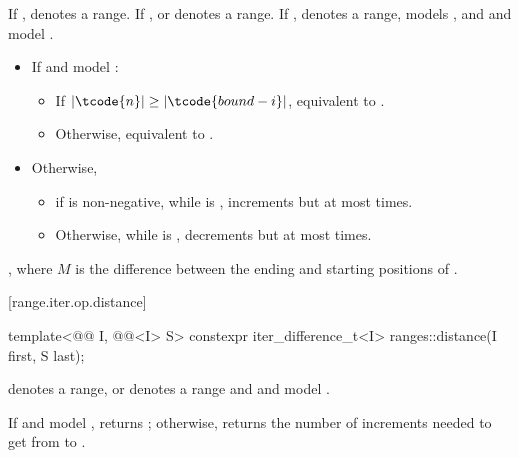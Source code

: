 \begin{itemdescr}
\pnum
\expects
If ,  denotes a range.
If ,  or  denotes a range.
If ,  denotes a range,
 models , and
 and  model .

\pnum
\effects
\begin{itemize}
\item If  and  model :
  \begin{itemize}
  \item If \brk{}$|\tcode{n}| \ge |\tcode{bound - i}|$,
    equivalent to .
  \item Otherwise, equivalent to .
  \end{itemize}
\item Otherwise,
  \begin{itemize}
  \item if  is non-negative,
    while  is ,
    increments  but at most  times.
  \item Otherwise,
    while  is ,
    decrements  but at most  times.
  \end{itemize}
\end{itemize}

\pnum
\returns
{}, where $M$ is the difference between
the ending and starting positions of .
\end{itemdescr}

[range.iter.op.distance]{}
%
\begin{itemdecl}
template<@@ I, @@<I> S>
  constexpr iter_difference_t<I> ranges::distance(I first, S last);
\end{itemdecl}

\begin{itemdescr}
\pnum
\expects
{} denotes a range, or
 denotes a range and
 and  model
.

\pnum
\effects
If  and  model ,
returns ;
otherwise, returns the number of increments needed to get from
to
.
\end{itemdescr}

